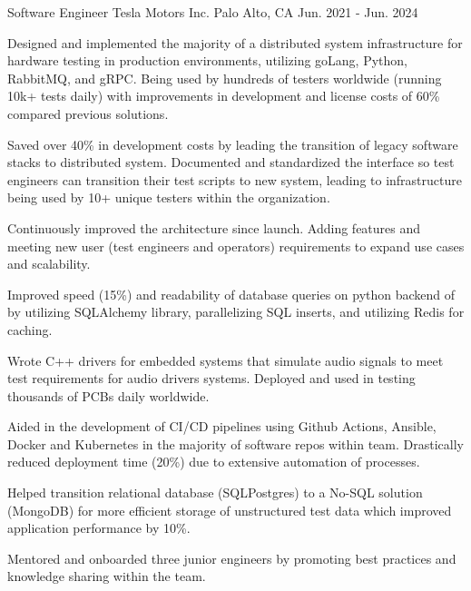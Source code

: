 

\begin{cventries}

  \cventry
    {Software Engineer} %
    {Tesla Motors Inc.} %
    {Palo Alto, CA} %
    {Jun. 2021 - Jun. 2024} %
    {
      \begin{cvitems} %
        \item {Designed and implemented the majority of a distributed system infrastructure for hardware testing in production environments, utilizing goLang, Python, RabbitMQ, and gRPC. Being used by hundreds of testers worldwide (running 10k+ tests daily) with improvements in development and license costs of 60\% compared previous solutions.}
        \item {Saved over 40\% in development costs by leading the transition of legacy software stacks to distributed system. Documented and standardized the interface so test engineers can transition their test scripts to new system, leading to infrastructure being used by 10+ unique testers within the organization.}
        \item {Continuously improved the architecture since launch. Adding features and meeting new user (test engineers and operators) requirements to expand use cases and scalability.}
        \item {Improved speed (15\%) and readability of database queries on python backend of by utilizing SQLAlchemy library, parallelizing SQL inserts, and utilizing Redis for caching.}
        \item {Wrote C++ drivers for embedded systems that simulate audio signals to meet test requirements for audio drivers systems. Deployed and used in testing thousands of PCBs daily worldwide.}
        \item {Aided in the development of CI/CD pipelines using Github Actions, Ansible, Docker and Kubernetes in the majority of software repos within team. Drastically reduced deployment time (20\%) due to extensive automation of processes.}
        \item {Helped transition relational database (SQLPostgres) to a No-SQL solution (MongoDB) for more efficient storage of unstructured test data which improved application performance by 10\%.}
        \item {Mentored and onboarded three junior engineers by promoting best practices and knowledge sharing within the team.}
 	   \end{cvitems}
    }
    

\end{cventries}
